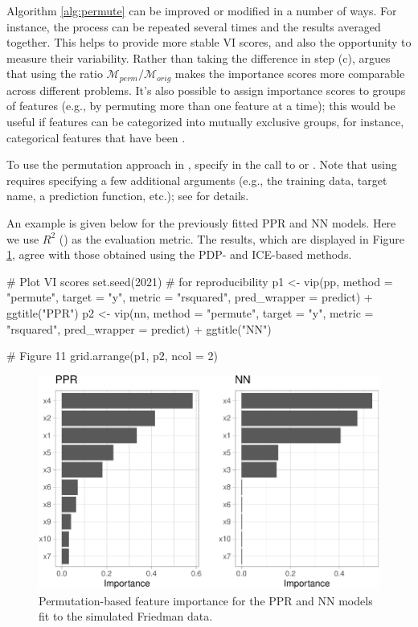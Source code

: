 Algorithm \ref{alg:permute} can be improved or modified in a number of
ways. For instance, the process can be repeated several times and the
results averaged together. This helps to provide more stable VI scores,
and also the opportunity to measure their variability. Rather than
taking the difference in step (c),
\citet[Chapter 5, Section 5.5.4]{molnar-2019-iml} argues that using the
ratio \(\mathcal{M}_{perm} / \mathcal{M}_{orig}\) makes the importance
scores more comparable across different problems. It's also possible to
assign importance scores to groups of features (e.g., by permuting more
than one feature at a time); this would be useful if features can be
categorized into mutually exclusive groups, for instance, categorical
features that have been .

To use the permutation approach in , specify
 in the call to  or .
Note that using  requires specifying a few
additional arguments (e.g., the training data, target name, a prediction
function, etc.); see  for details.

An example is given below for the previously fitted PPR and NN models.
Here we use \(R^2\) () as the evaluation
metric. The results, which are displayed in Figure
\ref{fig:vip-permute-ppr-nn}, agree with those obtained using the PDP-
and ICE-based methods.

\begin{Schunk}
\begin{Sinput}
# Plot VI scores
set.seed(2021)  # for reproducibility
p1 <- vip(pp, method = "permute", target = "y", metric = "rsquared",
          pred_wrapper = predict) + ggtitle("PPR")
p2 <- vip(nn, method = "permute", target = "y", metric = "rsquared",
          pred_wrapper = predict) + ggtitle("NN")

# Figure 11
grid.arrange(p1, p2, ncol = 2)
\end{Sinput}
\begin{figure}[!htb]

{\centering \includegraphics[width=0.7\linewidth]{greenwell-boehmke_files/figure-latex/vip-permute-ppr-nn-1} 

}

\caption[Permutation-based feature importance for the PPR and NN models fit to the simulated Friedman data]{Permutation-based feature importance for the PPR and NN models fit to the simulated Friedman data.}\label{fig:vip-permute-ppr-nn}
\end{figure}
\end{Schunk}

